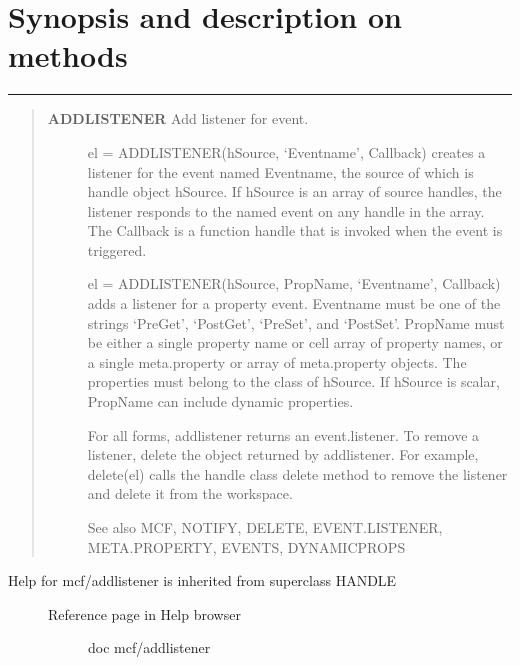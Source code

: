 \documentclass[letterpaper,10pt,english]{sphinxmanual}
\begin{document}
\section{Synopsis and description on methods}
\label{classes/utils/@mcf/mcf:synopsis-and-description-on-methods}

\bigskip\hrule{}\bigskip

\label{classes/utils/@mcf/mcf:addlistener}\begin{quote}
\begin{description}
\item[{\textbf{ADDLISTENER}   Add listener for event.}] \leavevmode
el = ADDLISTENER(hSource, `Eventname', Callback) creates a listener
for the event named Eventname, the source of which is handle object
hSource.  If hSource is an array of source handles, the listener
responds to the named event on any handle in the array.  The Callback
is a function handle that is invoked when the event is triggered.

el = ADDLISTENER(hSource, PropName, `Eventname', Callback) adds a
listener for a property event.  Eventname must be one of the strings
`PreGet', `PostGet', `PreSet', and `PostSet'.  PropName must be either
a single property name or cell array of property names, or a single
meta.property or array of meta.property objects.  The properties must
belong to the class of hSource.  If hSource is scalar, PropName can
include dynamic properties.

For all forms, addlistener returns an event.listener.  To remove a
listener, delete the object returned by addlistener.  For example,
delete(el) calls the handle class delete method to remove the listener
and delete it from the workspace.

See also MCF, NOTIFY, DELETE, EVENT.LISTENER, META.PROPERTY, EVENTS,
DYNAMICPROPS

\end{description}
\end{quote}
\begin{description}
\item[{Help for mcf/addlistener is inherited from superclass HANDLE}] \leavevmode\begin{description}
\item[{Reference page in Help browser}] \leavevmode
doc mcf/addlistener

\end{description}

\end{description}
\end{document}
